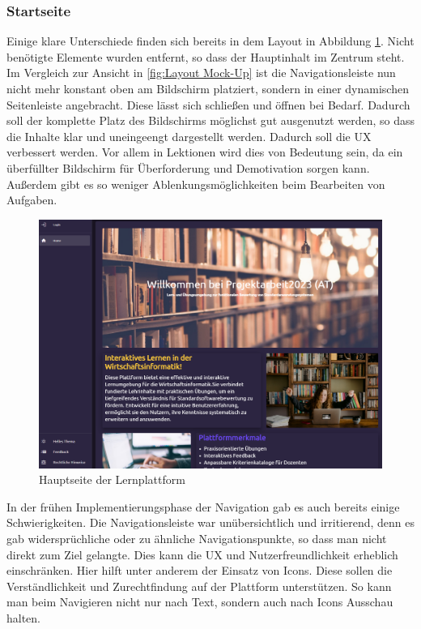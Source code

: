 \subsubsection{Startseite}

Einige klare Unterschiede finden sich bereits in dem Layout in Abbildung \ref{fig:mainpage_gui}. Nicht benötigte Elemente wurden entfernt, so dass der Hauptinhalt im Zentrum steht. Im Vergleich zur Ansicht in \ref{fig:Layout Mock-Up} ist die Navigationsleiste nun nicht mehr konstant oben am Bildschirm platziert, sondern in einer dynamischen Seitenleiste angebracht. Diese lässt sich schließen und öffnen bei Bedarf. Dadurch soll der komplette Platz des Bildschirms möglichst gut ausgenutzt werden, so dass die Inhalte klar und uneingeengt dargestellt werden. Dadurch soll die UX verbessert werden.
Vor allem in Lektionen wird dies von Bedeutung sein, da ein überfüllter Bildschirm für Überforderung und Demotivation sorgen kann. Außerdem gibt es so weniger Ablenkungsmöglichkeiten beim Bearbeiten von Aufgaben.

\begin{figure}[H]
    \centering
    \includegraphics[width=1.0\textwidth]{assets/screenshots/finale_gui/Hauptseite.png}
    \caption{Hauptseite der Lernplattform}
    \label{fig:mainpage_gui}
\end{figure}

In der frühen Implementierungsphase der Navigation gab es auch bereits einige Schwierigkeiten. Die Navigationsleiste war unübersichtlich und irritierend, denn es gab widersprüchliche oder zu ähnliche Navigationspunkte, so dass man nicht direkt zum Ziel gelangte. Dies kann die UX und Nutzerfreundlichkeit erheblich einschränken. Hier hilft unter anderem der Einsatz von Icons. Diese sollen die Verständlichkeit und Zurechtfindung auf der Plattform unterstützen. So kann man beim Navigieren nicht nur nach Text, sondern auch nach Icons Ausschau halten. 

